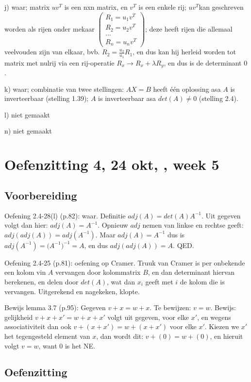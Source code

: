 \documentclass{article}
\begin{document}
j) waar; matrix $uv^T$ is een nxn matrix, en $v^T$ is een enkele rij;  $uv^T$kan geschreven worden als rijen onder mekaar $\begin{pmatrix}R_1=u_1v^T\\R_2=u_2v^T\\...\\R_n=u_nv^T\end{pmatrix}$; deze heeft rijen die allemaal veelvouden zijn van elkaar, bvb. $R_2 = \frac{u_2}{u_1}R_1$, en dus kan hij herleid worden tot matrix met nulrij via een rij-operatie $R_x \rightarrow R_x+\lambda R_y$, en dus is de determinant $0$. 

k) waar; combinatie van twee stellingen: $AX=B$ heeft \'e\'en oplossing asa $A$ is inverteerbaar (stelling 1.39); $A$ is inverteerbaar asa $det(A) \neq 0$ (stelling 2.4). 

l) niet gemaakt

n)  niet gemaakt 


\section{Oefenzitting 4, 24 okt, , week 5}

\subsection {Voorbereiding}

Oefening 2.4-28(l) (p.82): waar. Definitie $adj(A) = det(A) A^{-1}$. Uit gegeven volgt dan hier: $adj(A) = A^{-1}$. Opnieuw $adj$ nemen van linkse en rechtse geeft: $adj(adj(A)) = adj(A^{-1})$. Maar $adj(A) = A^{-1}$ dus is $adj(A^{-1}) = {(A^{-1}})^{-1} = A$, en dus $adj(adj(A)) = A$. QED. 

Oefening 2.4-25 (p.81): oefening op Cramer. Truuk van Cramer is per onbekende een kolom vin $A$ vervangen door kolommatrix $B$, en dan determinant hiervan berekenen, en delen door $det(A)$, wat dan $x_i$ geeft met $i$ de kolom die is vervangen. Uitgerekend en nagekeken, klopte. 

Bewijs lemma 3.7 (p.95): Gegeven $v+x=w+x$. Te bewijzen: $v=w$. Bewijs: gelijkheid $v+x+x'=w+x+x'$ volgt uit gegeven, voor elke $x'$, en wegens associativiteit dan ook $v+(x+x')=w+(x+x')$ voor elke $x'$. Kiezen we $x'$ het tegengesteld element van $x$, dan wordt dit: $v+(0)=w+(0)$, en hieruit volgt $v=w$, want $0$ is het NE. 

\subsection {Oefenzitting}
\end{document}
